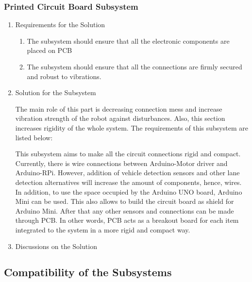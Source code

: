 \documentclass[a4paper,12pt]{article}
\begin{document}
	
	
	
	\subsubsection{Printed Circuit Board Subsystem}
	
		\begin{enumerate}
			\item {Requirements for the Solution}
			
			\begin{enumerate}
						\item The subsystem should ensure that all the electronic components are placed on PCB
						\item The subsystem should ensure that all the connections are firmly secured and robust to vibrations.
					\end{enumerate} 
					
			\item {Solution for the Subsystem}
			
			The main role of this part is decreasing connection mess and increase vibration strength of the robot against disturbances. Also, this section increases rigidity of the whole system. The requirements of this subsystem are listed below:	
	
	This subsystem aims to make all the circuit connections rigid and compact. Currently, there is wire connections between Arduino-Motor driver and Arduino-RPi. However, addition of vehicle detection sensors and other lane detection alternatives will increase the amount of components, hence, wires. In addition, to use the space occupied by the Arduino UNO board, Arduino Mini can be used. This also allows to build the circuit board as shield for Arduino Mini. After that any other sensors and connections can be made through PCB. In other words, PCB acts as a breakout board for each item integrated to the system in a more rigid and compact way.
			
			\item {Discussions on the Solution}
			
		\end{enumerate}	
	
	
	
	\subsection{Compatibility of the Subsystems}
	
\end{document}
